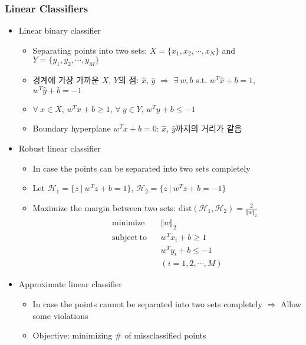 \subsubsection*{Linear Classifiers}
\begin{itemize}
    \item Linear binary classifier
    \begin{itemize}
        \item Separating points into two sets: $X=\{x_1,x_2,\cdots,x_N\}$ and $Y=\{y_1,y_2,\cdots,y_M\}$
        \item 경계에 가장 가까운 $X$, $Y$의 점: $\hat{x}$, $\hat{y}$ $\Rightarrow$ $\exists~w,b$ s.t. $w^T\hat{x}+b=1$, $w^T\hat{y}+b=-1$
        \item $\forall~x\in X$, $w^Tx+b\geq1$, $\forall~y\in Y$, $w^Ty+b\leq-1$
        \item Boundary hyperplane $w^Tx+b=0$: $\hat{x}$, $\hat{y}$까지의 거리가 같음
    \end{itemize}
    \item Robust linear classifier
    \begin{itemize}
        \item In case the points can be separated into two sets completely
        \item Let $\mathcal{H}_1=\{z~|~w^Tz+b=1\}$, $\mathcal{H}_2=\{z~|~w^Tz+b=-1\}$
        \item Maximize the margin between two sets: $\mathrm{dist}(\mathcal{H}_1,\mathcal{H}_2)=\frac{2}{\Vert w\Vert_2}$
        \begin{equation}\begin{aligned}
            \mathrm{minimize}~~&~~\Vert w\Vert_2 \\
            \mathrm{subject~to}~~&~~w^Tx_i+b\geq1\\
                &~~w^Ty_i+b\leq-1\\
                &~~(i=1,2,\cdots,M)
        \end{aligned}\end{equation}
    \end{itemize}
    \clearpage
    \item Approximate linear classifier
    \begin{itemize}
        \item In case the points cannot be separated into two sets completely $\Rightarrow$ Allow some violations
        \item Objective: minimizing \# of missclassified points
        \begin{equation}\begin{aligned}

\end{aligned}
\end{equation}
\end{itemize}
\end{itemize}
